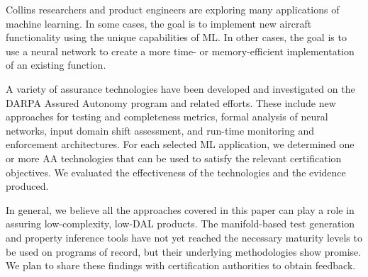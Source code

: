 Collins researchers and product engineers are exploring many applications of machine learning.  In some cases, the goal is to implement new aircraft functionality using the unique capabilities of ML.  In other cases, the goal is to use a neural network to create a more time- or memory-efficient implementation of an existing function.  

A variety of assurance technologies have been developed and investigated on the DARPA Assured Autonomy program and related efforts.  These include new approaches for testing and completeness metrics, formal analysis of neural networks, input domain shift assessment, and run-time monitoring and enforcement architectures.
For each selected ML application, we determined one or more AA technologies that can be used to satisfy the relevant certification objectives.  We evaluated the effectiveness of the technologies and the evidence produced.

In general, we believe all the approaches covered in this paper can play a role in assuring low-complexity, low-DAL products.  The manifold-based test generation and property inference tools have not yet reached the necessary maturity levels to be used on programs of record, but their underlying methodologies show promise.  
We plan to share these findings with certification authorities to obtain feedback.

